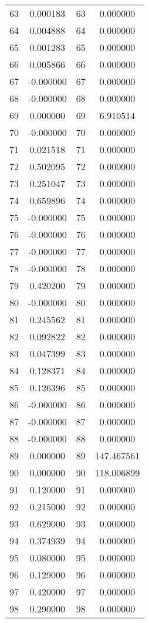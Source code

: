\documentclass[12pt]{article}
\begin{document}
\begin{longtable}{@{}cccc@{}}
63 & 0.000183 & 63 & 0.000000 \\
64 & 0.004888 & 64 & 0.000000 \\
65 & 0.001283 & 65 & 0.000000 \\
66 & 0.005866 & 66 & 0.000000 \\
67 & -0.000000 & 67 & 0.000000 \\
68 & -0.000000 & 68 & 0.000000 \\
69 & 0.000000 & 69 & 6.910514 \\
70 & -0.000000 & 70 & 0.000000 \\
71 & 0.021518 & 71 & 0.000000 \\
72 & 0.502095 & 72 & 0.000000 \\
73 & 0.251047 & 73 & 0.000000 \\
74 & 0.659896 & 74 & 0.000000 \\
75 & -0.000000 & 75 & 0.000000 \\
76 & -0.000000 & 76 & 0.000000 \\
77 & -0.000000 & 77 & 0.000000 \\
78 & -0.000000 & 78 & 0.000000 \\
79 & 0.420200 & 79 & 0.000000 \\
80 & -0.000000 & 80 & 0.000000 \\
81 & 0.245562 & 81 & 0.000000 \\
82 & 0.092822 & 82 & 0.000000 \\
83 & 0.047399 & 83 & 0.000000 \\
84 & 0.128371 & 84 & 0.000000 \\
85 & 0.126396 & 85 & 0.000000 \\
86 & -0.000000 & 86 & 0.000000 \\
87 & -0.000000 & 87 & 0.000000 \\
88 & -0.000000 & 88 & 0.000000 \\
89 & 0.000000 & 89 & 147.467561 \\
90 & 0.000000 & 90 & 118.006899 \\
91 & 0.120000 & 91 & 0.000000 \\
92 & 0.215000 & 92 & 0.000000 \\
93 & 0.629000 & 93 & 0.000000 \\
94 & 0.374939 & 94 & 0.000000 \\
95 & 0.080000 & 95 & 0.000000 \\
96 & 0.129000 & 96 & 0.000000 \\
97 & 0.420000 & 97 & 0.000000 \\
98 & 0.290000 & 98 & 0.000000 \\

\end{longtable}
\end{document}
